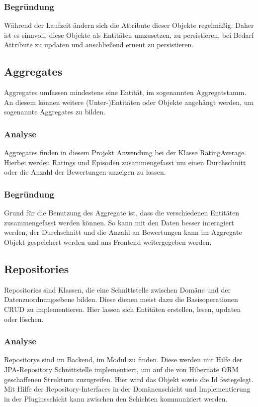         \subsubsection{Begründung}
         Während der Laufzeit ändern sich die Attribute dieser Objekte regelmäßig. Daher ist es sinnvoll, diese Objekte als Entitäten umzusetzen, zu persistieren, bei Bedarf Attribute zu updaten und anschließend erneut zu persistieren.

    \subsection{Aggregates}
    Aggregates umfassen mindestens eine Entität, im sogenannten Aggregatstamm. An diesem können weitere (Unter-)Entitäten oder Objekte angehängt werden, um sogenannte Aggregates zu bilden.

        \subsubsection{Analyse}
        Aggregates finden in diesem Projekt Anwendung bei der Klasse RatingAverage. Hierbei werden Ratings und Episoden zusammengefasst um einen Durchschnitt oder die Anzahl der Bewertungen anzeigen zu lassen.
        
        \subsubsection{Begründung}
        Grund für die Benutzung des Aggregate ist, dass die verschiedenen Entitäten zusammengefasst werden können. So kann mit den Daten besser interagiert werden, der Durchschnitt und die Anzahl an Bewertungen kann im Aggregate Objekt gespeichert werden und ans Frontend weitergegeben werden.

    \subsection{Repositories}
    Repositories sind Klassen, die eine Schnittstelle zwischen Domäne und der Datenzuordnungsebene bilden. Diese dienen meist dazu die Basisoperationen CRUD zu implementieren. Hier lassen sich Entitäten erstellen, lesen, updaten oder löschen.
    
        \subsubsection{Analyse}
        Repositorys sind im Backend, im Modul  zu finden. Diese werden mit Hilfe der JPA-Repository Schnittstelle implementiert, um auf die von Hibernate ORM geschaffenen Strukturn zuzugreifen. Hier wird das Objekt sowie die Id festegelegt. Mit Hilfe der Repository-Interfaces in der Domänenschicht und Implementierung in der Pluginsschicht kann zwischen den Schichten kommuniziert werden.

